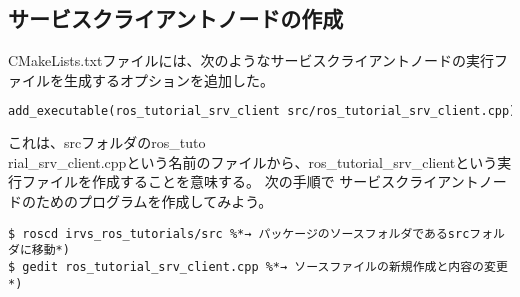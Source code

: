 \subsection{サービスクライアントノードの作成}
CMakeLists.txtファイルには、次のようなサービスクライアントノードの実行ファイルを生成するオプションを追加した。

\begin{lstlisting}[language=make]
add_executable(ros_tutorial_srv_client src/ros_tutorial_srv_client.cpp)
\end{lstlisting}

これは、srcフォルダのros\_tuto\\rial\_srv\_client.cppという名前のファイルから、ros\_tutorial\_srv\_clientという実行ファイルを作成することを意味する。
 次の手順で  サービスクライアントノードのためのプログラムを作成してみよう。

\begin{lstlisting}[language=ROS]
$ roscd irvs_ros_tutorials/src %*→ パッケージのソースフォルダであるsrcフォルダに移動*)
$ gedit ros_tutorial_srv_client.cpp %*→ ソースファイルの新規作成と内容の変更*)
\end{lstlisting}

